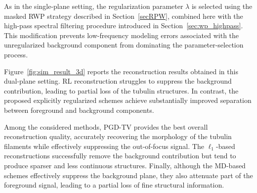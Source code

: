 \documentclass[letterpaper]{article}
\begin{document}
As in the single-plane setting, the regularization parameter $\lambda$ is selected using the masked RWP strategy described in Section~\ref{secRPW}, combined here with the high-pass spectral filtering procedure introduced in Section~\ref{sec:wp_highpass}. This modification prevents low-frequency modeling errors associated with the unregularized background component from dominating the parameter-selection process.

Figure~\ref{fig:sim_result_3d} reports the reconstruction results obtained in this dual-plane setting. RL reconstruction struggles to suppress the background contribution, leading to partial loss of the tubulin structures. In contrast, the proposed explicitly regularized schemes achieve substantially improved separation between foreground and background components.

Among the considered methods, PGD-TV provides the best overall reconstruction quality, accurately recovering the morphology of the tubulin filaments while effectively suppressing the out-of-focus signal. The $\ell_1$-based reconstructions successfully remove the background contribution but tend to produce sparser and less continuous structures. Finally, although the MD-based schemes effectively suppress the background plane, they also attenuate part of the foreground signal, leading to a partial loss of fine structural information.
\end{document}
